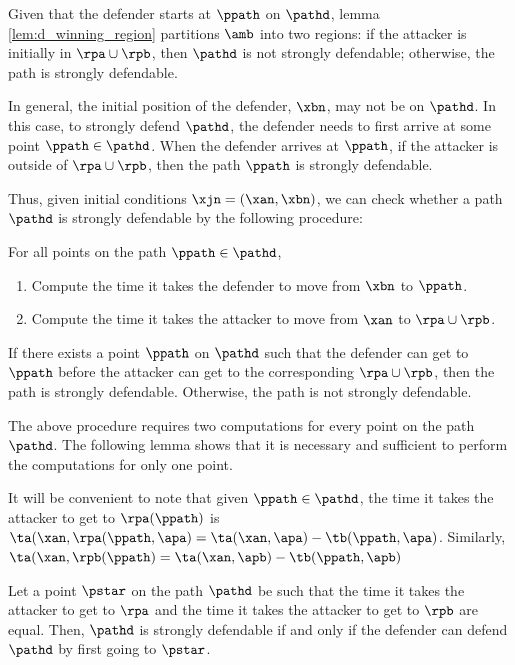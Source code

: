 Given that the defender starts at $\ppath$ on $\pathd$, lemma \ref{lem:d_winning_region} partitions $\amb$ into two regions: if the attacker is initially in $\rpa \cup \rpb$, then $\pathd$ is not strongly defendable; otherwise, the path is strongly defendable.

In general, the initial position of the defender, $\xbn$, may not be on $\pathd$. In this case, to strongly defend $\pathd$, the defender needs to first arrive at some point $\ppath\in\pathd$. When the defender arrives at $\ppath$, if the attacker is outside of $\rpa\cup\rpb$, then the path $\ppath$ is strongly defendable. 

Thus, given initial conditions $\xjn = (\xan,\xbn)$, we can check whether a path $\pathd$ is strongly defendable by the following procedure:

For all points on the path $\ppath\in\pathd$,
\begin{enumerate}
\item Compute the time it takes the defender to move from $\xbn$ to $\ppath$.
\item Compute the time it takes the attacker to move from $\xan$ to $\rpa\cup\rpb$.
\end{enumerate}
If there exists a point $\ppath$ on $\pathd$ such that the defender can get to $\ppath$ before the attacker can get to the corresponding $\rpa\cup\rpb$, then the path is strongly defendable. Otherwise, the path is not strongly defendable.

The above procedure requires two computations for every point on the path $\pathd$. The following lemma shows that it is necessary and sufficient to perform the computations for only one point.

\begin{rem} \label{rem:time_to_region_a}
It will be convenient to note that given $\ppath\in\pathd$, the time it takes the attacker to get to $\rpa(\ppath)$ is $\ta(\xan,\rpa(\ppath,\apa) = \ta(\xan,\apa) - \tb(\ppath,\apa)$. Similarly, $\ta(\xan,\rpb(\ppath) = \ta(\xan,\apb) - \tb(\ppath,\apb)$
\end{rem}

\begin{lem} \label{lem:pstar}
Let a point $\pstar$ on the path $\pathd$ be such that the time it takes the attacker to get to $\rpa$ and the time it takes the attacker to get to $\rpb$ are equal. Then, $\pathd$ is strongly defendable if and only if the defender can defend $\pathd$ by first going to $\pstar$.
\end{lem}

